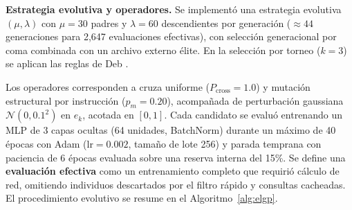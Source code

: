 \documentclass[10pt,twocolumn,letterpaper]{article}
\begin{document}
\textbf{Estrategia evolutiva y operadores.} Se implementó una estrategia evolutiva $(\mu, \lambda)$ con $\mu=30$ padres y $\lambda=60$ descendientes por generación ($\approx 44$ generaciones para 2{,}647 evaluaciones efectivas), con selección generacional por coma combinada con un archivo externo élite. En la selección por torneo ($k=3$) se aplican las reglas de Deb \citep{deb2000}.

Los operadores corresponden a cruza uniforme ($P_{\mathrm{cross}} = 1.0$) y mutación estructural por instrucción ($p_m = 0.20$), acompañada de perturbación gaussiana $\mathcal{N}(0, 0.1^2)$ en $e_k$, acotada en $[0, 1]$. Cada candidato se evaluó entrenando un MLP de 3 capas ocultas (64 unidades, BatchNorm) durante un máximo de 40 épocas con Adam ($\mathrm{lr}=0.002$, tamaño de lote 256) y parada temprana con paciencia de 6 épocas evaluada sobre una reserva interna del 15\%. Se define una \textbf{evaluación efectiva} como un entrenamiento completo que requirió cálculo de red, omitiendo individuos descartados por el filtro rápido y consultas cacheadas. El procedimiento evolutivo se resume en el Algoritmo~\ref{alg:elgp}.
\end{document}
